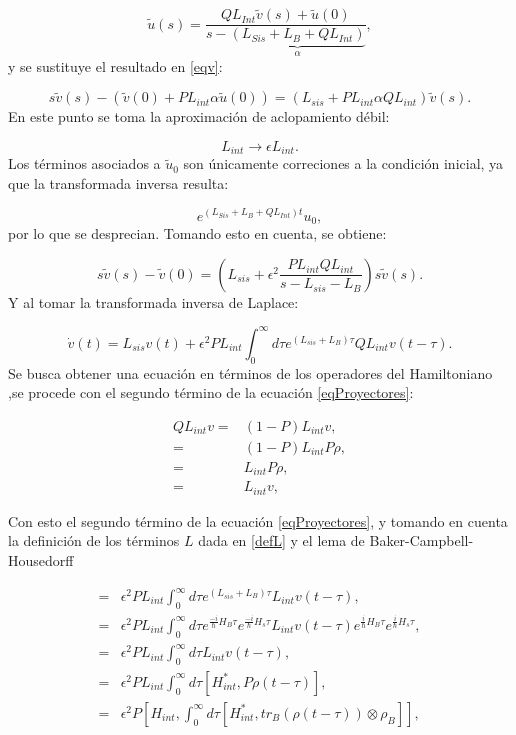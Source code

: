 \documentclass[a4paper,10pt]{report}
\begin{document}
\begin{equation}
\tilde{u}(s)=\frac{QL_{Int}\tilde{v}(s)+\tilde{u}(0)}{s-\underbrace{(L_{Sis}+L_B+QL_{Int})}_\alpha},
\end{equation} y se sustituye el resultado en \eqref{eqv}:

\begin{equation}
s\tilde{v}(s)-(\tilde{v}(0)+PL_{int}\alpha\tilde{u}(0))=(L_{sis}+PL_{int}\alpha QL_{int})\tilde{v}(s).
\end{equation} En este punto se toma la aproximación de aclopamiento débil:

\begin{equation}
L_{int} \rightarrow \epsilon L_{int}.
\end{equation} Los términos asociados a $\tilde{u}_0$ son únicamente correciones a la condición inicial, ya que la transformada inversa resulta:

\begin{equation}
e^{(L_{Sis}+L_B+QL_{Int})t}u_0,
\end{equation} por lo que se desprecian. Tomando esto en cuenta, se obtiene:

\begin{equation}
s\tilde{v}(s)-\tilde{v}(0) = (L_{sis}+\epsilon^2\frac{PL_{int}QL_{int}}{s-L_{sis}-L_{B}})s\tilde{v}(s).
\end{equation} Y al tomar la transformada inversa de Laplace:

\begin{equation}\label{eqProyectores}
\dot{v}(t)=L_{sis}v(t) + \epsilon^2 PL_{int} \int_{0}^{\infty}d\tau e^{(L_{sis}+L_{B})\tau}QL_{int}v(t-\tau).
\end{equation} Se busca obtener una ecuación en términos de los operadores del Hamiltoniano \cite{ZollerQN},se procede con el segundo término de la ecuación \eqref{eqProyectores}:

\begin{align*}
QL_{int}v=&(1-P)L_{int}v,\\
=& (1-P)L_{int}P\rho, \\
=& L_{int}P\rho, \\
=& L_{int}v,
\end{align*}

Con esto el segundo término de la ecuación \eqref{eqProyectores}, y tomando en cuenta la definición de los términos $L$ dada en \eqref{defL} y el lema de Baker-Campbell-Housedorff \cite{SakuraiQM}

\begin{align*}
=& \epsilon^2 PL_{int} \int_{0}^{\infty}d\tau e^{(L_{sis}+L_{B})\tau}L_{int}v(t-\tau),\\
=& \epsilon^2 PL_{int} \int_{0}^{\infty}d\tau e^{\frac{-i}{\hbar}H_B\tau}e^{\frac{-i}{\hbar}H_s\tau}L_{int}v(t-\tau)e^{\frac{i}{\hbar}H_B\tau}e^{\frac{i}{\hbar}H_s\tau},\\
=&\epsilon^2 PL_{int} \int_{0}^{\infty}d\tau L_{int}v(t-\tau), \\
=&\epsilon^2 PL_{int} \int_{0}^{\infty}d\tau[H_{int}^*,P\rho(t-\tau)], \\
=&\epsilon^2 P[H_{int},\int_{0}^{\infty}d\tau[H_{int}^*,tr_B(\rho(t-\tau))\otimes\rho_B]],
\end{align*}
\end{document}
